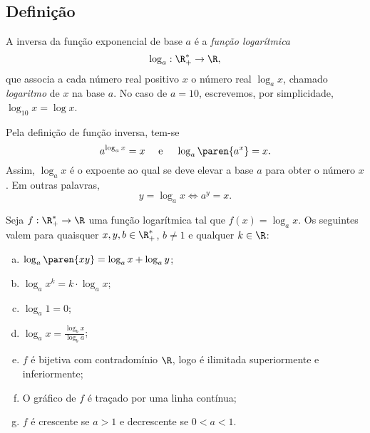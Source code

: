 \subsection{Definição}

\begin{definition}
A inversa da função exponencial de base $a$ é a \emph{função
logarítmica}
$$\log_a : \R_+^* \to \R,$$
que associa a cada número real positivo $x$ o número real $\log_a
x$, chamado \emph{logaritmo} de $x$ na base $a$. No caso de $a=10$,
escrevemos, por simplicidade, $\log_{10}x = \log x$.
\end{definition}

\begin{remark}
    Pela definição de função inversa, tem-se
$$ a^{\log_a x}=x \ \ \ \text{ e } \ \ \ \log_a \paren{a^x} = x.$$
Assim, $\log_a x $ é o expoente ao qual se deve elevar a base $a$
para obter o número $x$. Em outras palavras,
$$ y = \log_a x \iff a^y = x.$$
\end{remark}

\begin{proposition}
    Seja $f: \R_+^* \to \R$ uma função logarítmica tal que $f(x) =
\log_a x$. Os seguintes valem para quaisquer  $x, y, b \in
\R_+^*$, $b \neq 1$ e qualquer $k \in \R$:
\begin{enumerate}[(a)]
  \item $\log_a \paren{xy} = \log_a x + \log_a y$;
  \item $\log_a x^k = k\cdot \log_a x$;
  \item $\log_a 1 = 0$;
  \item $\log_a x = \frac{\log_b x}{\log_b a}$;
  \item $f$ é bijetiva com contradomínio $\R$, logo é ilimitada superiormente e inferiormente;
  \item O gráfico de $f$ é traçado por uma linha contínua;
  \item $f$ é crescente se $a>1$ e decrescente se $0<a<1$.
\end{enumerate}
\end{proposition}

